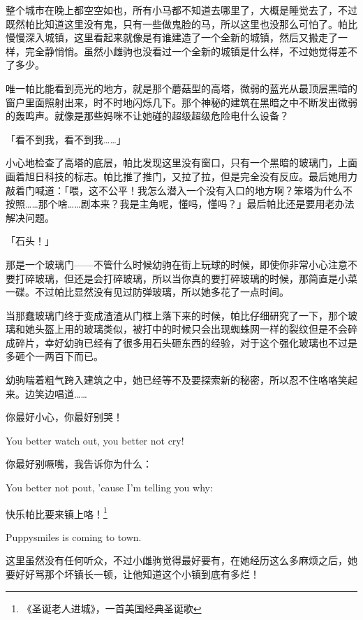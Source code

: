 整个城市在晚上都空空如也，所有小马都不知道去哪里了，大概是睡觉去了，不过既然帕比知道这里没有鬼，只有一些做鬼脸的马，所以这里也没那么可怕了。帕比慢慢深入城镇，这里看起来就像是有谁建造了一个全新的城镇，然后又搬走了一样，完全静悄悄。虽然小雌驹也没看过一个全新的城镇是什么样，不过她觉得差不了多少。

唯一帕比能看到亮光的地方，就是那个蘑菇型的高塔，微弱的蓝光从最顶层黑暗的窗户里面照射出来，时不时地闪烁几下。那个神秘的建筑在黑暗之中不断发出微弱的轰鸣声。就像是那些妈咪不让她碰的超级超级危险电什么设备？

「看不到我，看不到我……」

小心地检查了高塔的底层，帕比发现这里没有窗口，只有一个黑暗的玻璃门，上面画着旭日科技的标志。帕比推了推门，又拉了拉，但是完全没有反应。最后她用力敲着门喊道：「喂，这不公平！我怎么潜入一个没有入口的地方啊？笨塔为什么不按照……那个啥……剧本来？我是主角呢，懂吗，懂吗？」最后帕比还是要用老办法解决问题。

「石头！」

那是一个玻璃门——不管什么时候幼驹在街上玩球的时候，即使你非常小心注意不要打碎玻璃，但还是会打碎玻璃，所以当你真的要打碎玻璃的时候，那简直是小菜一碟。不过帕比显然没有见过防弹玻璃，所以她多花了一点时间。

当那蠢玻璃门终于变成渣渣从门框上落下来的时候，帕比仔细研究了一下，那个玻璃和她头盔上用的玻璃类似，被打中的时候只会出现蜘蛛网一样的裂纹但是不会碎成碎片，幸好幼驹已经有了很多用石头砸东西的经验，对于这个强化玻璃也不过是多砸个一两百下而已。

幼驹喘着粗气跨入建筑之中，她已经等不及要探索新的秘密，所以忍不住咯咯笑起来。边笑边唱道……

\begin{song}
你最好小心，你最好别哭！

You better watch out, you better not cry!

\medskip

你最好别噘嘴，我告诉你为什么：

You better not pout, 'cause I'm telling you why:

\medskip

快乐帕比要来镇上咯！\footnote{《圣诞老人进城》，一首美国经典圣诞歌}

Puppysmiles is coming to town.
\end{song}

这里虽然没有任何听众，不过小雌驹觉得最好要有，在她经历这么多麻烦之后，她要好好骂那个坏镇长一顿，让他知道这个小镇到底有多烂！

